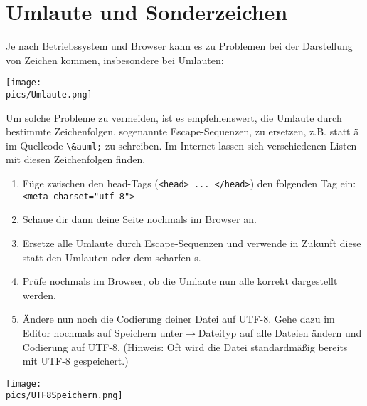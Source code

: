 \section{Umlaute und Sonderzeichen}
Je nach Betriebssystem und Browser kann es zu Problemen bei der Darstellung von Zeichen kommen, insbesondere bei Umlauten:

\begin{minipage}[t]{0.8\textwidth}
    \texttt{[image: \\pics/Umlaute.png]}
\end{minipage}

Um solche Probleme zu vermeiden, ist es empfehlenswert, die Umlaute durch bestimmte Zeichenfolgen, sogenannte Escape-Sequenzen, zu ersetzen, z.B. statt ä im Quellcode \lstinline|\&auml;| zu schreiben. Im Internet lassen sich verschiedenen Listen mit diesen Zeichenfolgen finden.

\begin{Exercise}[title=, label=Umlaute]
    \begin{enumerate}
        \item Füge zwischen den head-Tags (\lstinline|<head> ... </head>|) den folgenden Tag ein: \lstinline|<meta charset="utf-8">|
        \item Schaue dir dann deine Seite nochmals im Browser an.
        \item Ersetze alle Umlaute durch Escape-Sequenzen und verwende in Zukunft diese statt den Umlauten oder dem scharfen s.
        \item Prüfe nochmals im Browser, ob die Umlaute nun alle korrekt dargestellt werden.
        \item Ändere nun noch die Codierung deiner Datei auf UTF-8. Gehe dazu im Editor nochmals auf Speichern unter\(\rightarrow\)Dateityp auf alle Dateien ändern und Codierung auf UTF-8. (Hinweis: Oft wird die Datei standardmäßig bereits mit UTF-8 gespeichert.)
    \end{enumerate}
    \begin{minipage}[t]{\textwidth}
        \texttt{[image: \\pics/UTF8Speichern.png]}
    \end{minipage}%
\end{Exercise}